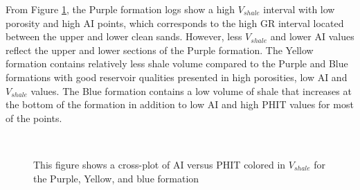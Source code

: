 \documentclass[fleqn]{article}
\begin{document}
From Figure \ref{fig:FormationCrossPlots}, the Purple formation logs show a high $V_{shale}$ interval with low porosity and high AI points, which corresponds to the high GR interval located between the upper and lower clean sands. However, less $V_{shale}$ and lower AI values reflect the upper and lower sections of the Purple formation. The Yellow formation contains relatively less shale volume compared to the Purple and Blue formations with good reservoir qualities presented in high porosities, low AI and $V_{shale}$ values. The Blue formation contains a low volume of shale that increases at the bottom of the formation in addition to low AI and high PHIT values for most of the points.

\begin{figure}[H]
    \centering
     \\
    \caption{This figure shows a cross-plot of AI versus PHIT colored in $V_{shale}$ for the Purple, Yellow, and blue formation}
    \label{fig:FormationCrossPlots}
\end{figure}
\end{document}
